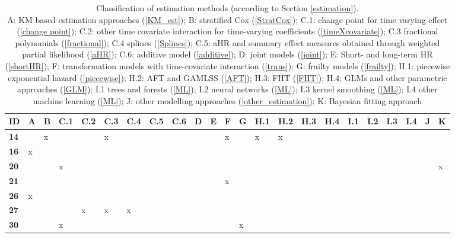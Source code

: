 \begin{landscape}
\begin{longtable}{|p{0.305in}|p{0.15in}|p{0.15in}|p{0.15in}|p{0.15in}|p{0.15in}|p{0.15in}|p{0.15in}|p{0.15in}|p{0.15in}|p{0.15in}|p{0.15in}|p{0.15in}|p{0.15in}|p{0.15in}|p{0.15in}|p{0.15in}|p{0.15in}|p{0.15in}|p{0.15in}|p{0.15in}|p{0.15in}|p{0.15in}|} 
\caption{Classification of estimation methods (according to Section \ref{estimation}).\\ 
A: KM based estimation approaches (\ref{KM_est}); B: stratified Cox (\ref{StratCox}); C.1: change point for time varying effect (\ref{change point}); C.2: other time covariate interaction for time-varying coefficients (\ref{timeXcovariate}); C.3 fractional polynomials (\ref{fractional}); C.4 splines (\ref{Splines}); C.5: aHR and summary effect measures obtained through weighted partial likelihood (\ref{aHR}); C.6: additive model (\ref{additive}); D: joint models (\ref{joint}); E: Short- and long-term HR (\ref{shortHR}); F: transformation models with time-covariate interaction (\ref{trans}); G: frailty models (\ref{frailty}); H.1: piecewise exponential hazard (\ref{piecewise}); H.2: AFT and GAMLSS (\ref{AFT}); H.3: FHT (\ref{FHT}); H.4: GLMs and other parametric approaches (\ref{GLM}); 
I.1 trees and forests (\ref{ML}); 
I.2 neural networks (\ref{ML}); 
I.3 kernel smoothing (\ref{ML}); 
I.4 other machine learning (\ref{ML}); 
J: other modelling approaches (\ref{other_estimation}); 
K: Bayesian fitting approach} 
\label{tab:S2} 
\\
\hline 
ID & A & B & C.1 & C.2 & C.3 & C.4 & C.5 & C.6 & D & E & F & G & H.1 & H.2 & H.3 & H.4 & I.1 & I.2 & I.3 & I.4 & J & K \\ \hline 
\textbf{14} &  & x &  &  & x &  &  &  &  &  & x &  & x & x &  &  &  & ~ & ~ & ~ & ~ &  \\ \hline 
\textbf{16} & x &  &  &  &  &  &  &  &  &  &  &  &  &  &  &  &  &  &  &  &  &  \\ \hline 
\textbf{20} &  &  & x &  &  & &  &  &  &  &  &  &  &  &  &  &  &  &  &  &  & x \\ \hline 
\textbf{21} &  &  &  &  &  &  &  &  &  &  & x & \NEW{ } &  &  &  &  &  &  &  &  &  &  \\ \hline 
\textbf{26} & x &  &  &  &  &  &  &  &  &  &  &  &  &  &  &  &  &  &  &  &  &  \\ \hline 
\textbf{27} &  &  &  & x & x & x &  &  &  &  &  &  &  &  &  &  &  &  &  &  &  &  \\ \hline 
\textbf{30} &  &  & x &  &  &  &  &  &  &  &  & x &  &  &  &  &  &  &  &  &  &  \\ \hline 

\end{longtable}
\end{landscape}
